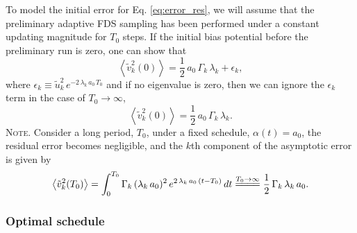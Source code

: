 \documentclass[preprint, superscriptaddress, floatfix]{revtex4-1}
\newcommand{\note}[1]{{\color{DarkGreen}\footnotesize \textsc{Note.} #1}}
\begin{document}



To model the initial error for Eq. \eqref{eq:error_res},
we will assume that
the preliminary adaptive FDS sampling has been
performed under a constant updating magnitude for $T_0$ steps.
%
If the initial bias potential
before the preliminary run is zero,
one can show that
\begin{equation}
  \left\langle
    {\tilde v}_k^2(0)
  \right\rangle
  = \frac 1 2 \, a_0 \, \Gamma_k \, \lambda_k
  + \epsilon_k
  ,
  \label{eq:xt2_eql1}
\end{equation}
%
where
$\epsilon_k \equiv \tilde u_k^2 \, e^{-2\, \lambda_k \, a_0 \, T_0}$
and if no eigenvalue is zero,
then we can ignore the $\epsilon_k$ term
in the case of $T_0 \to \infty$,
%
\begin{equation}
  \left\langle
    {\tilde v}_k^2(0)
  \right\rangle
  = \frac 1 2 \, a_0 \, \Gamma_k \, \lambda_k
  .
  \label{eq:xt2_eql}
\end{equation}
%
\note{
Consider a long period, $T_0$, under a fixed schedule,
$\alpha(t) = a_0$,
the residual error becomes negligible, and
the $k$th component of the asymptotic error
is given by
%
\begin{align*}
  \left\langle
    {\tilde v}_k^2(T_0)
  \right\rangle
  =
  \int_0^{T_0}
    \Gamma_k \, (\lambda_k \, a_0)^2 \,
      e^{ 2 \, \lambda_k \, a_0 \, (t - T_0) }
    \, dt
  \stackrel{ T_0 \to \infty }
  { =\joinrel=\joinrel=\joinrel= }
  \frac 1 2 \, \Gamma_k \, \lambda_k \, a_0
  .
\notag
\end{align*}
}
%



\subsubsection{\label{sec:optschedule}
Optimal schedule}
\end{document}
